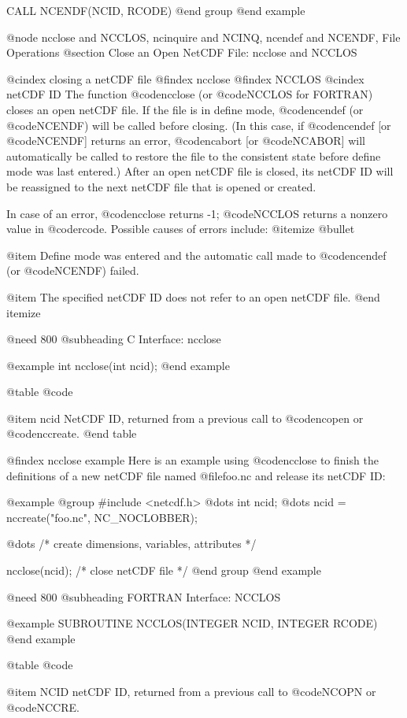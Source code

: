      CALL NCENDF(NCID, RCODE)
@end group
@end example

@node ncclose and NCCLOS, ncinquire and NCINQ, ncendef and NCENDF, File Operations
@section Close an Open NetCDF File:  ncclose and NCCLOS

@cindex closing a netCDF file
@findex ncclose
@findex NCCLOS
@cindex netCDF ID
The function @code{ncclose} (or @code{NCCLOS} for FORTRAN) closes an
open netCDF file.  If the file is in define mode, @code{ncendef} (or
@code{NCENDF}) will be called before closing.  (In this case, if
@code{ncendef} [or @code{NCENDF}] returns an error, @code{ncabort} [or
@code{NCABOR}] will automatically be called to restore the file to the
consistent state before define mode was last entered.)  After an open
netCDF file is closed, its netCDF ID will be reassigned to the next
netCDF file that is opened or created.

In case of an error, @code{ncclose} returns -1; @code{NCCLOS} returns a
nonzero value in @code{rcode}.  Possible causes of errors include:
@itemize @bullet

@item
Define mode was entered and the automatic call made to
@code{ncendef} (or @code{NCENDF}) failed.

@item
The specified netCDF ID does not refer to an open netCDF file.
@end itemize

@need 800
@subheading C Interface:  ncclose

@example
int ncclose(int ncid);
@end example

@table @code

@item ncid
NetCDF ID, returned from a previous call to @code{ncopen} or @code{nccreate}.
@end table

@findex ncclose example
Here is an example using @code{ncclose} to finish the definitions of a
new netCDF file named @file{foo.nc} and release its netCDF ID:

@example
@group
#include <netcdf.h>
   @dots{}
int ncid;
   @dots{}
ncid = nccreate("foo.nc", NC_NOCLOBBER);

   @dots{}      /* create dimensions, variables, attributes */

ncclose(ncid);       /* close netCDF file */
@end group
@end example

@need 800
@subheading FORTRAN Interface:  NCCLOS

@example
SUBROUTINE NCCLOS(INTEGER NCID, INTEGER RCODE)
@end example

@table @code

@item NCID
netCDF ID, returned from a previous call to @code{NCOPN} or @code{NCCRE}.

